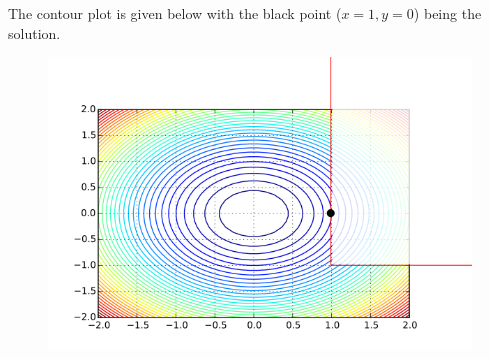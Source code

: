 The contour plot is given below with the black point ($x=1, y=0$) being the solution.

\begin{figure}[H]
\includegraphics{images/convex_opt_05.png}
\end{figure}

